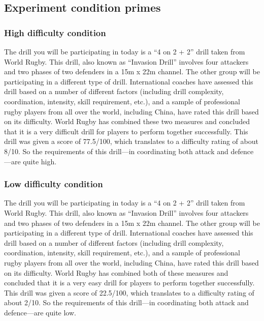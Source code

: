 \subsection{\label{app6:conditionPrime}Experiment condition primes}

\subsubsection{\label{app6:conditionPrimeHigh}High difficulty condition}
The drill you will be participating in today is a ``4 on 2 + 2'' drill taken from World Rugby.  This drill, also known as ``Invasion Drill'' involves four attackers and two phases of two defenders in a 15m x 22m channel.  The other group will be participating in a different type of drill.  International coaches have assessed this drill based on a number of different factors (including drill complexity, coordination, intensity, skill requirement, etc.), and a sample of professional rugby players from all over the world, including China, have rated this drill based on its difficulty.  World Rugby has combined these two measures and concluded that it is a very difficult drill for players to perform together successfully.  This drill was given a score of 77.5/100, which translates to a difficulty rating of about 8/10.  So the requirements of this drill—in coordinating both attack and defence—are quite high.

\subsubsection{\label{app6:conditionPrimeLow}Low difficulty condition}
The drill you will be participating in today is a ``4 on 2 + 2'' drill taken from World Rugby.  This drill, also known as ``Invasion Drill'' involves four attackers and two phases of two defenders in a 15m x 22m channel.  The other group will be participating in a different type of drill.  International coaches have assessed this drill based on a number of different factors (including drill complexity, coordination, intensity, skill requirement, etc.), and a sample of professional rugby players from all over the world, including China, have rated this drill based on its difficulty.  World Rugby has combined both of these measures and concluded that it is a very easy drill for players to perform together successfully.  This drill was given a score of 22.5/100, which translates to a difficulty rating of about 2/10.  So the requirements of this drill—in coordinating both attack and defence—are quite low.

